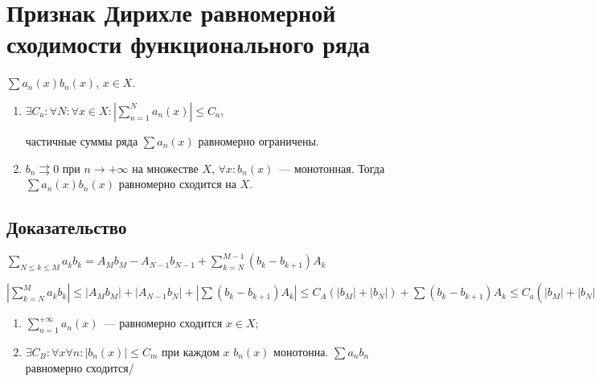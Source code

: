 \documentclass{article}
\begin{document}
    \newpage
    
    \section{Признак Дирихле равномерной сходимости функционального ряда}
    
        $\sum a_n(x) b_n(x)$, $x \in X$.
        
        \begin{enumerate}
        
            \item $\exists C_a : \forall N : \forall x \in X : \left| \sum\limits^N_{n = 1} a_n(x) \right| \leqslant C_a$, 
            
                частичные суммы ряда $\sum a_n(x)$ равномерно ограничены.
            
            \item $b_n \rightrightarrows 0$ при $n \rightarrow +\infty$ на множестве $X$, $\forall x : b_n(x)$~--- монотонная. Тогда $\sum a_n(x) b_n(x)$ равномерно сходится на $X$.
            
        \end{enumerate}
        
        \subsection{Доказательство}
        
            $\sum\limits_{N \leq k \leq M} a_k b_k = A_M b_M - A_{N - 1} b_{N - 1} + \sum\limits^{M - 1}_{k = N} (b_k - b_{k + 1}) A_k$
            
            $\left| \sum\limits^M_{k = N} a_k b_k \right| \leq |A_M b_M| + |A_{N - 1} b_N| + \left| \sum (b_k - b_{k + 1} ) A_k \right| \leq C_A \left( |b_M| + |b_N| \right) + \sum(b_k - b_{k + 1})A_k \leq C_a \left( | b_M | + | b_N | + \sum^{M - 1}_{k = N} (b_k - b_{k + 1}) \right) \leq C_a \left( |b_M| + |b_N| + |b_M| + |b_N| \right) \rightarrow c$
            
            \begin{enumerate}
            
                \item $\sum\limits^{+\infty}_{n = 1} a_n(x)$~--- равномерно сходится $x \in X$;
                
                \item $\exists C_B : \forall x \forall n : |b_n(x)| \leq C_m$ при каждом $x$ $b_n(x)$ монотонна. $\sum a_n b_n$ равномерно сходится/
                
            \end{enumerate}
            
\end{document}
